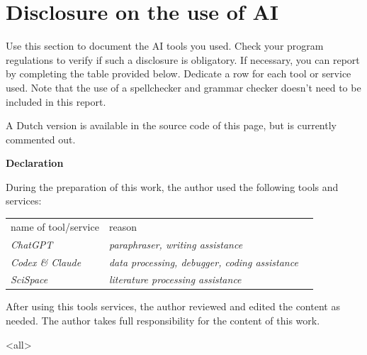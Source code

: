 \chapter*{Disclosure on the use of AI}


\begin{explanation}
Use this section to document the AI tools you used. Check your program regulations to verify if such a disclosure is obligatory. If necessary, you can report by completing the table provided below. Dedicate a row for each tool or service used. Note that the use of a spellchecker and grammar checker doesn't need to be included in this report.

A Dutch version is available in the source code of this page, but is currently commented out.
\end{explanation}

\textbf{Declaration}

During the preparation of this work, the author used the following tools and services:

\begin{center}
    \renewcommand{\arraystretch}{1.3} %
    \begin{tabular}{p{4cm}lp{6cm}}
         \toprule
         name of tool/service   & reason         \\[+2ex]
         \emph{ChatGPT}         & \emph{paraphraser, writing assistance}  \\
         \emph{Codex \& Claude} & \emph{data processing, debugger, coding assistance}  \\
          \emph{SciSpace}       &  \emph{literature processing assistance}             \\
         \bottomrule
    \end{tabular}
\end{center}


After using this tools services, the author reviewed and edited the content as needed. The author takes full responsibility for the content of this work.






\mode<all> %



